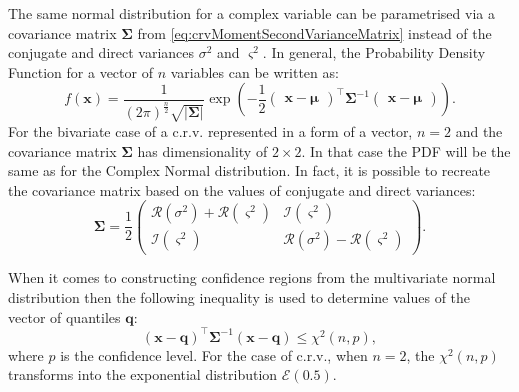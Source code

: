 \documentclass[
]{book}
\begin{document}
The same normal distribution for a complex variable can be parametrised via a covariance matrix \(\boldsymbol{\Sigma}\) from \eqref{eq:crvMomentSecondVarianceMatrix} instead of the conjugate and direct variances \(\sigma^2\) and \(\varsigma^2\). In general, the Probability Density Function for a vector of \(n\) variables can be written as:
\begin{equation}
    f(\mathbf{x}) = \frac{1}{(2 \pi)^{\frac{n}{2}} \sqrt{|\boldsymbol{\Sigma}|}} \exp\left(- \frac{1}{2}
        \begin{pmatrix} \mathbf{x} - \boldsymbol{\mu} \end{pmatrix}^\top \boldsymbol{\Sigma}^{-1} \begin{pmatrix} \mathbf{x} - \boldsymbol{\mu} \end{pmatrix}
    \right).
    \label{eq:MultivariateNormalPDF}
\end{equation}
For the bivariate case of a c.r.v. represented in a form of a vector, \(n=2\) and the covariance matrix \(\boldsymbol{\Sigma}\) has dimensionality of \(2 \times 2\). In that case the PDF will be the same as for the Complex Normal distribution. In fact, it is possible to recreate the covariance matrix based on the values of conjugate and direct variances:
\begin{equation}
    \boldsymbol{\Sigma} = \frac{1}{2} \begin{pmatrix} \mathcal{R}(\sigma^2) + \mathcal{R}(\varsigma^2) & \mathcal{I}(\varsigma^2) \\
                                                      \mathcal{I}(\varsigma^2) & \mathcal{R}(\sigma^2) - \mathcal{R}(\varsigma^2) \end{pmatrix} .
    \label{eq:MultivariateNormalPDFCovariance}
\end{equation}

When it comes to constructing confidence regions from the multivariate normal distribution then the following inequality is used to determine values of the vector of quantiles \(\mathbf{q}\):
\begin{equation}
    (\mathbf{x} - \mathbf{q})^{\top} \mathbf{\Sigma}^{-1} (\mathbf{x} - \mathbf{q}) \leq \chi^2(n, p) ,
    \label{eq:MultivariateNormalRegion}
\end{equation}
where \(p\) is the confidence level. For the case of c.r.v., when \(n=2\), the \(\chi^2(n, p)\) transforms into the exponential distribution \(\mathcal{E}(0.5)\).
\end{document}
